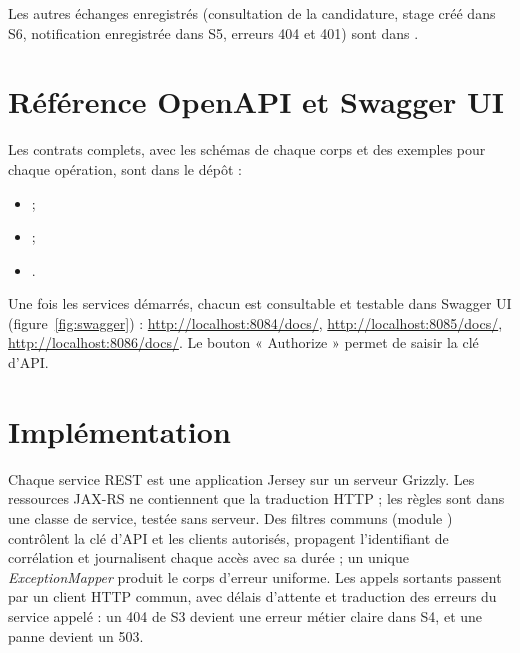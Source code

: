 



Les autres échanges enregistrés (consultation de la candidature, stage créé dans S6, notification enregistrée dans S5, erreurs 404 et 401) sont dans .

\section{Référence OpenAPI et Swagger UI}

Les contrats complets, avec les schémas de chaque corps et des exemples pour chaque opération, sont dans le dépôt :
\begin{itemize}
  \item {} ;
  \item {} ;
  \item {}.
\end{itemize}
Une fois les services démarrés, chacun est consultable et testable dans Swagger UI (figure~\ref{fig:swagger}) : \url{http://localhost:8084/docs/}, \url{http://localhost:8085/docs/}, \url{http://localhost:8086/docs/}. Le bouton « Authorize » permet de saisir la clé d'API.


\section{Implémentation}

Chaque service REST est une application Jersey sur un serveur Grizzly. Les ressources JAX-RS ne contiennent que la traduction HTTP ; les règles sont dans une classe de service, testée sans serveur. Des filtres communs (module ) contrôlent la clé d'API et les clients autorisés, propagent l'identifiant de corrélation et journalisent chaque accès avec sa durée ; un unique \emph{ExceptionMapper} produit le corps d'erreur uniforme. Les appels sortants passent par un client HTTP commun, avec délais d'attente et traduction des erreurs du service appelé : un 404 de S3 devient une erreur métier claire dans S4, et une panne devient un 503.
